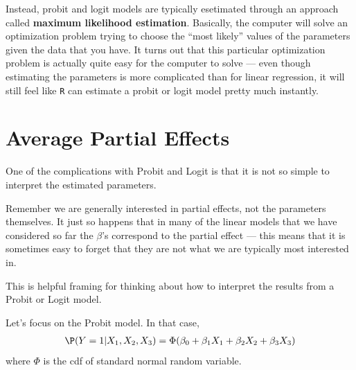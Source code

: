 \documentclass[
  letterpaper,
  DIV=11,
  numbers=noendperiod]{scrreprt}
\begin{document}
Instead, probit and logit models are typically esetimated through an
approach called \textbf{maximum likelihood estimation}. Basically, the
computer will solve an optimization problem trying to choose the ``most
likely'' values of the parameters given the data that you have. It turns
out that this particular optimization problem is actually quite easy for
the computer to solve --- even though estimating the parameters is more
complicated than for linear regression, it will still feel like
\texttt{R} can estimate a probit or logit model pretty much instantly.

\section{Average Partial Effects}\label{average-partial-effects}

One of the complications with Probit and Logit is that it is not so
simple to interpret the estimated parameters.

Remember we are generally interested in partial effects, not the
parameters themselves. It just so happens that in many of the linear
models that we have considered so far the \(\beta\)'s correspond to the
partial effect --- this means that it is sometimes easy to forget that
they are not what we are typically most interested in.

This is helpful framing for thinking about how to interpret the results
from a Probit or Logit model.

Let's focus on the Probit model. In that case, \begin{align*}
  \P(Y=1|X_1,X_2,X_3) = \Phi(\beta_0 + \beta_1 X_1 + \beta_2 X_2 + \beta_3 X_3)
\end{align*} where \(\Phi\) is the cdf of standard normal random
variable.
\end{document}
